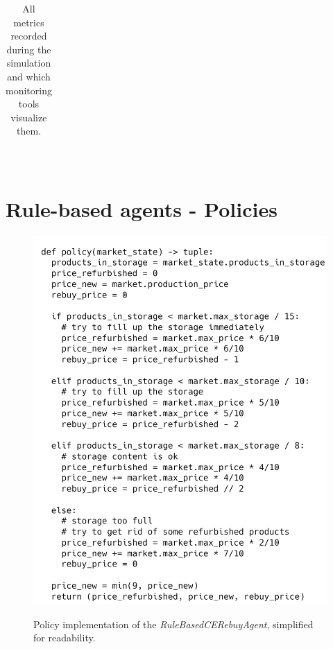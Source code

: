\begin{table}[!]
\begin{tabular}{|cr|p{2.2mm}|p{2.2mm}|p{2.2mm}|p{2.2mm}|p{2.2mm}|p{2.2mm}|p{2.2mm}|p{2.2mm}|p{2.2mm}|p{2.2mm}|p{2.2mm}|p{2.2mm}|p{2.2mm}|p{2.2mm}|p{2.2mm}|p{2.2mm}|}
	\end{tabular}\\
	\caption{All metrics recorded during the simulation and which monitoring tools visualize them.}\label{tab:AllMetrics}
\end{table}

\newpage
\section{Rule-based agents - Policies}

\begin{figure}[ht]
	\includegraphics[width = \textwidth]{images/policies/RuleBasedCERebuyAgentPolicy.png}\\
	\caption{Policy implementation of the \emph{RuleBasedCERebuyAgent}, simplified for readability.}\label{fig:PolicyRuleBasedCERebuy}
\end{figure}

